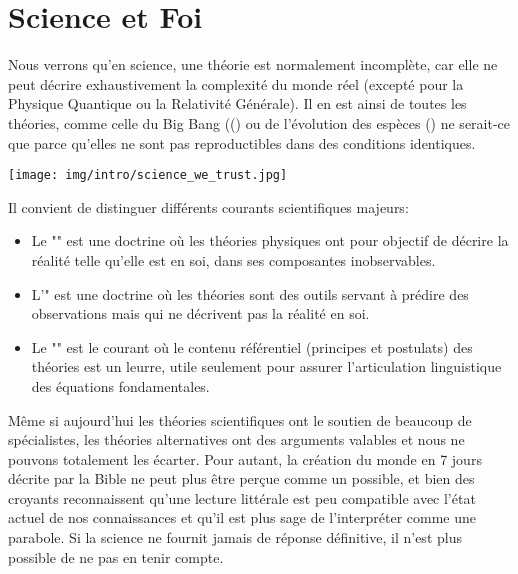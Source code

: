 	\newpage
	\thispagestyle{empty}
	\mbox{}
	\section{Science et Foi}
	Nous verrons qu'en science, une théorie est normalement incomplète, car elle ne peut décrire exhaustivement la complexité du monde réel (excepté pour la Physique Quantique ou la Relativité Générale). Il en est ainsi de toutes les théories, comme celle du Big Bang (() ou de l'évolution des espèces () ne serait-ce que parce qu'elles ne sont pas reproductibles dans des conditions identiques.
	\begin{center}
		\texttt{[image: img/intro/science\_we\_trust.jpg]}
	\end{center}	

	Il convient de distinguer différents courants scientifiques majeurs: 
	\begin{itemize}
		\item Le "" est une doctrine où les théories physiques ont pour objectif de décrire la réalité telle qu'elle est en soi, dans ses composantes inobservables.
	
		\item L'" est une doctrine où les théories sont des outils servant à prédire des observations mais qui ne décrivent pas la réalité en soi.
	
		\item Le "" est le courant où le contenu référentiel (principes et postulats) des théories est un leurre, utile seulement pour assurer l'articulation linguistique des équations fondamentales.
	\end{itemize}

	\pagebreak
	Même si aujourd'hui les théories scientifiques ont le soutien de beaucoup de spécialistes, les théories alternatives ont des arguments valables et nous ne pouvons totalement les écarter. Pour autant, la création du monde en 7 jours décrite par la Bible ne peut plus être perçue comme un possible, et bien des croyants reconnaissent qu'une lecture littérale est peu compatible avec l'état actuel de nos connaissances et qu'il est plus sage de l'interpréter comme une parabole. Si la science ne fournit jamais de réponse définitive, il n'est plus possible de ne pas en tenir compte.
	
